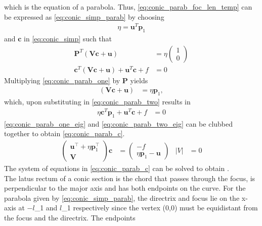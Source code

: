 \documentclass[journal,10pt,twocolumn]{article}
\providecommand{\abs}[1]{\left\vert#1\right\vert}
\let\vec\mathbf
\newcommand{\myvec}[1]{\ensuremath{\begin{pmatrix}#1\end{pmatrix}}}
\providecommand{\brak}[1]{\ensuremath{\left(#1\right)}}
\begin{document}
which is the equation of a parabola. 
Thus, \eqref{eq:conic_parab_foc_len_temp} 
can be expressed as \eqref{eq:conic_simp_parab} by choosing
\begin{align}
\eta = \vec{u}^T\vec{p}_1
\end{align}
and $\vec{c}$ in \eqref{eq:conic_simp} such that
\begin{align}
\label{eq:conic_parab_one}
\vec{P}^{T}\brak{\vec{V}\vec{c}+\vec{u}} &= \eta\myvec{1\\0}
\\
\vec{c}^T\brak{\vec{V}\vec{c} + \vec{u}}+ \vec{u}^T\vec{c} + f&= 0
\label{eq:conic_parab_two}
\end{align}
Multiplying \eqref{eq:conic_parab_one} by $\vec{P}$ yields
\begin{align}
\label{eq:conic_parab_one_eig}
\brak{\vec{V}\vec{c}+\vec{u}} &= \eta\vec{p}_1,
\end{align}
which, upon substituting in \eqref{eq:conic_parab_two}
results in 
\begin{align}
\eta\vec{c}^T\vec{p}_1 + \vec{u}^T\vec{c} + f&= 0
\label{eq:conic_parab_two_eig}
\end{align}
\eqref{eq:conic_parab_one_eig} and \eqref{eq:conic_parab_two_eig} can be clubbed together to obtain \eqref{eq:conic_parab_c}.
\begin{align}
    \myvec{ \vec{u}^{\top}+\eta\vec{p}_1^{\top} \\ \vec{V}}\vec{c} &= \myvec{-f \\ \eta\vec{p}_1-\vec{u}}  &\abs{V} &= 0
    \label{eq:conic_parab_c}
    \end{align}
The system of equations in \eqref{eq:conic_parab_c} can be solved to obtain \vec{c}.\\
The latus rectum of a conic section is the chord that passes through the focus, is perpendicular to the major axis and has both endpoints on the curve. For the parabola given by \eqref{eq:conic_simp_parab}, the directrix and focus lie on the x-axis at  $-l$\vec{e}_1 and $l$\vec{e}_1 respectively since the vertex (0,0) must be equidistant from the focus and the directrix. The endpoints  
\end{document}
